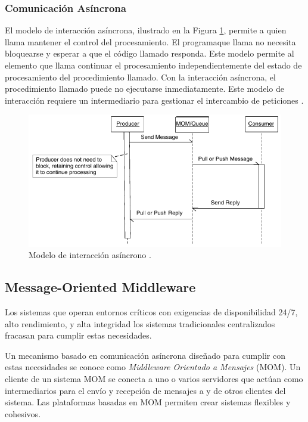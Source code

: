 \documentclass[conference,compsoc]{IEEEtran}
\begin{document}
\subsubsection{Comunicación Asíncrona}

El modelo de interacción asíncrona, ilustrado en la Figura \ref{fig:async}, permite a quien llama mantener el control del procesamiento. El programaque llama no necesita bloquearse y esperar a que el código llamado responda. Este modelo permite al elemento que llama continuar el procesamiento independientemente del estado de procesamiento del procedimiento llamado. Con la interacción asíncrona, el procedimiento llamado puede no ejecutarse inmediatamente. Este modelo de interacción requiere un intermediario para gestionar el intercambio de peticiones \cite{curry_2004}.

\begin{figure}[hb]
    \centering
    \includegraphics[width=\columnwidth]{async.png}
    \caption{Modelo de interacción asíncrono \cite[][Figura 1.2]{curry_2004}.}
    \label{fig:async}
\end{figure}

\subsection{Message-Oriented Middleware}

Los sistemas que operan entornos críticos con exigencias de disponibilidad 24/7, alto rendimiento, y alta integridad los sistemas tradicionales centralizados fracasan para cumplir estas necesidades.

Un mecanismo basado en comunicación asíncrona diseñado para cumplir con estas necesidades se conoce como \emph{Middleware Orientado a Mensajes} (MOM).\cite{curry_2004} Un cliente de un sistema MOM se conecta a uno o varios servidores que actúan como intermediarios para el envío y recepción de mensajes a y de otros clientes del sistema. Las plataformas basadas en MOM permiten crear sistemas flexibles y cohesivos.
\end{document}
